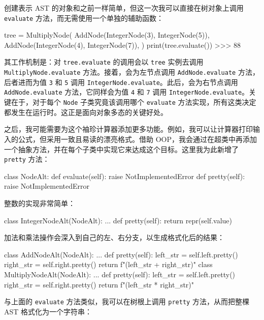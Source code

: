 创建表示 AST 的对象和之前一样简单，但这一次我可以直接在树对象上调用 \texttt{evaluate} 方法，而无需使用一个单独的辅助函数：

\begin{codebox}[python]
tree = MultiplyNode(
    AddNode(IntegerNode(3), IntegerNode(5)),
    AddNode(IntegerNode(4), IntegerNode(7)),
)
print(tree.evaluate())
>>>
88
\end{codebox}

其工作机制是：对 \texttt{tree.evaluate} 的调用会以 \texttt{tree} 实例去调用 \texttt{MultiplyNode.evaluate} 方法。接着，会为左节点调用 \texttt{AddNode.evaluate} 方法，后者进而为值 \texttt{3} 和 \texttt{5} 调用 \texttt{IntegerNode.evaluate}。此后，会为右节点调用 \texttt{AddNode.evaluate} 方法，它同样会为值 \texttt{4} 和 \texttt{7} 调用 \texttt{IntegerNode.evaluate}。关键在于，对于每个 \texttt{Node} 子类究竟该调用哪个 \texttt{evaluate} 方法实现，所有这类决定都发生在运行时。这正是面向对象多态的关键好处。

之后，我可能需要为这个袖珍计算器添加更多功能。例如，我可以让计算器打印输入的公式，但采用一致且易读的漂亮格式。借助 OOP，我会通过在超类中再添加一个抽象方法，并在每个子类中实现它来达成这个目标。这里我为此新增了 \texttt{pretty} 方法：

\begin{codebox}[python]
class NodeAlt:
    def evaluate(self):
        raise NotImplementedError
    def pretty(self):
        raise NotImplementedError
\end{codebox}

整数的实现非常简单：

\begin{codebox}[python]
class IntegerNodeAlt(NodeAlt):
    ...
    def pretty(self):
        return repr(self.value)
\end{codebox}

加法和乘法操作会深入到自己的左、右分支，以生成格式化后的结果：

\begin{codebox}[python]
class AddNodeAlt(NodeAlt):
    ...
    def pretty(self):
        left_str = self.left.pretty()
        right_str = self.right.pretty()
        return f"({left_str} + {right_str})"
class MultiplyNodeAlt(NodeAlt):
    ...
    def pretty(self):
        left_str = self.left.pretty()
        right_str = self.right.pretty()
        return f"({left_str} * {right_str})"
\end{codebox}

与上面的 \texttt{evaluate} 方法类似，我可以在树根上调用 \texttt{pretty} 方法，从而把整棵 AST 格式化为一个字符串：

